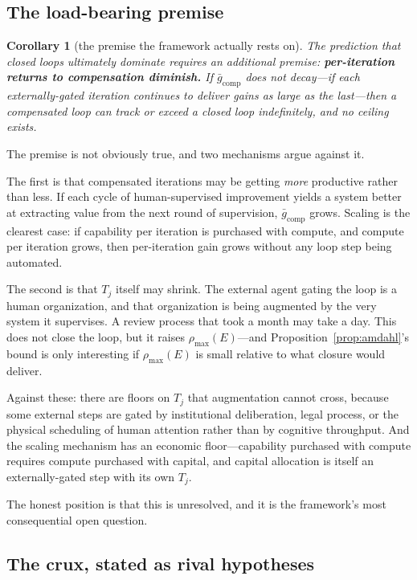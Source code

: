 \documentclass[11pt]{article}
\newtheorem{corollary}{Corollary}
\begin{document}
\subsection{The load-bearing premise}

\begin{corollary}[the premise the framework actually rests on]
\label{cor:premise}
The prediction that closed loops ultimately dominate requires an additional premise: \textbf{per-iteration returns to compensation diminish.} If $\bar{g}_{\mathrm{comp}}$ does not decay---if each externally-gated iteration continues to deliver gains as large as the last---then a compensated loop can track or exceed a closed loop indefinitely, and no ceiling exists.
\end{corollary}

The premise is not obviously true, and two mechanisms argue against it.

The first is that compensated iterations may be getting \emph{more} productive rather than less. If each cycle of human-supervised improvement yields a system better at extracting value from the next round of supervision, $\bar{g}_{\mathrm{comp}}$ grows. Scaling is the clearest case: if capability per iteration is purchased with compute, and compute per iteration grows, then per-iteration gain grows without any loop step being automated.

The second is that $T_j$ itself may shrink. The external agent gating the loop is a human organization, and that organization is being augmented by the very system it supervises. A review process that took a month may take a day. This does not close the loop, but it raises $\rho_{\max}(E)$---and Proposition~\ref{prop:amdahl}'s bound is only interesting if $\rho_{\max}(E)$ is small relative to what closure would deliver.

Against these: there are floors on $T_j$ that augmentation cannot cross, because some external steps are gated by institutional deliberation, legal process, or the physical scheduling of human attention rather than by cognitive throughput. And the scaling mechanism has an economic floor---capability purchased with compute requires compute purchased with capital, and capital allocation is itself an externally-gated step with its own $T_j$.

The honest position is that this is unresolved, and it is the framework's most consequential open question.

\subsection{The crux, stated as rival hypotheses}
\label{sec:crux}
\end{document}
